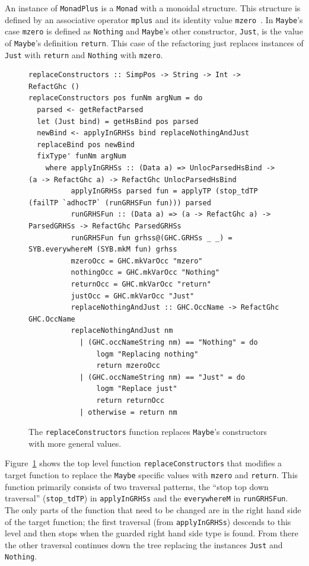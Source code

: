 An instance of \texttt{MonadPlus} is a \texttt{Monad} with a monoidal structure.
This structure is defined by an associative operator \texttt{mplus} and its identity value \texttt{mzero}~\citep{typeclassopedia}. 
In \texttt{Maybe}'s case \texttt{mzero} is defined as \texttt{Nothing} and \texttt{Maybe}'s other constructor, \texttt{Just}, is the value of \texttt{Maybe}'s definition \texttt{return}.
This case of the refactoring just replaces instances of \texttt{Just} with \texttt{return} and \texttt{Nothing} with \texttt{mzero}. 

\begin{figure}[t]
\begin{lstlisting}
replaceConstructors :: SimpPos -> String -> Int -> RefactGhc ()
replaceConstructors pos funNm argNum = do
  parsed <- getRefactParsed
  let (Just bind) = getHsBind pos parsed
  newBind <- applyInGRHSs bind replaceNothingAndJust
  replaceBind pos newBind
  fixType' funNm argNum
    where applyInGRHSs :: (Data a) => UnlocParsedHsBind -> (a -> RefactGhc a) -> RefactGhc UnlocParsedHsBind
          applyInGRHSs parsed fun = applyTP (stop_tdTP (failTP `adhocTP` (runGRHSFun fun))) parsed
          runGRHSFun :: (Data a) => (a -> RefactGhc a) -> ParsedGRHSs -> RefactGhc ParsedGRHSs
          runGRHSFun fun grhss@(GHC.GRHSs _ _) = SYB.everywhereM (SYB.mkM fun) grhss
          mzeroOcc = GHC.mkVarOcc "mzero"
          nothingOcc = GHC.mkVarOcc "Nothing"
          returnOcc = GHC.mkVarOcc "return"
          justOcc = GHC.mkVarOcc "Just"
          replaceNothingAndJust :: GHC.OccName -> RefactGhc GHC.OccName
          replaceNothingAndJust nm
            | (GHC.occNameString nm) == "Nothing" = do
                logm "Replacing nothing"
                return mzeroOcc
            | (GHC.occNameString nm) == "Just" = do
                logm "Replace just"
                return returnOcc            
            | otherwise = return nm
\end{lstlisting}
\caption{The \texttt{replaceConstructors} function replaces \texttt{Maybe}'s constructors with more general values.}
\label{replaceConstructors}
\end{figure}

Figure~\ref{replaceConstructors} shows the top level function \texttt{replaceConstructors} that modifies a target function to replace the \texttt{Maybe} specific values with \texttt{mzero} and \texttt{return}. This function primarily consists of two traversal patterns, the ``stop top down traversal'' (\texttt{stop\_tdTP}) in \texttt{applyInGRHSs} and the \texttt{everywhereM} in \texttt{runGRHSFun}. The only parts of the function that need to be changed are in the right hand side of the target function; the first traversal (from \texttt{applyInGRHSs}) descends to this level and then stops when the guarded right hand side type is found. From there the other traversal continues down the tree replacing the instances \texttt{Just} and \texttt{Nothing}.

